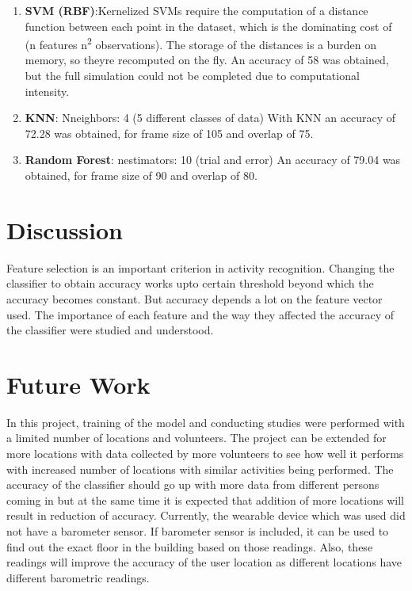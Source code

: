 \documentclass{acm_proc_article-sp}
\begin{document}
\begin{enumerate}
\begin{enumerate}
\item \textbf{SVM (RBF)}:Kernelized SVMs require the computation of a distance function between each point in the dataset, which is the dominating cost of (n features \textsc{}  n\textsuperscript{2} observations). The storage of the distances is a burden on memory, so they\textsc{}re recomputed on the fly. An accuracy of 58\textsc{} was obtained, but the full simulation could not be completed due to computational intensity.
\item \textbf{KNN}:
N\textsc{}neighbors: 4 (5 different classes of data)
With KNN an accuracy of 72.28\textsc{} was obtained, for frame size of 105 and overlap of 75.

\item \textbf{Random Forest}:
n\textsc{}estimators: 10 (trial and error)
An accuracy of 79.04\textsc{} was obtained, for frame size of 90 and overlap of 80.
\end{enumerate}

\end{enumerate}


\section{Discussion}
Feature selection is an important criterion in activity recognition. Changing the classifier to obtain accuracy works upto certain threshold beyond which the accuracy becomes constant. But accuracy depends a lot on the feature vector used. The importance of each feature and the way they affected the accuracy of the classifier were studied and understood. 

\section{Future Work}
In this project, training of the model and conducting studies were performed with a limited number of locations and volunteers. The project can be extended for more locations with data collected by more volunteers to see how well it performs with increased number of locations with similar activities being performed. The accuracy of the classifier should go up with more data from different persons coming in but at the same time it is expected that addition of more locations will result in reduction of accuracy.
Currently, the wearable device which was used did not have a barometer sensor. If barometer sensor is included, it can be used to find out the exact floor in the building based on those readings. Also, these readings will improve the accuracy of the user location as different locations have different barometric readings\cite{Banerjee:2015:IFL:2802083.2802089}.
\end{document}
